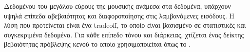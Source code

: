Δεδομένου του μεγάλου εύρους της μουσικής ανάμεσα στα δεδομένα, υπάρχουν υψηλά
επίπεδα αβεβαιότητας και διαφοροποίησης στις λαμβανόμενες εισόδους. Η λύση που
προτείνεται είναι ένα tradeoff, το οποίο είναι βασισμένο σε στατιστικές και
συγκεκριμένα δεδομένα. Για κάθε επίπεδο τόνου και διάρκειας, χτίζεται ένας
δείκτης βεβαιότητας πρόβλεψης κενού το οποίο χρησιμοποιείται όπως το .
\undef{\fp}
\undef{\fps}
